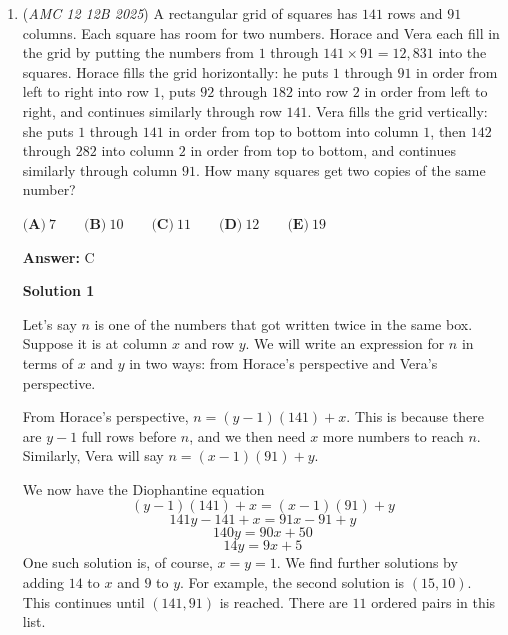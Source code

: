 \begin{enumerate}
 expectation. In addition to the win, the expected number of games is $p(1 + \frac{1}{q})$.

 Assume a loss. That is a $q$ chance. After the first game, he can win with expectation $1p$, lose-win $2qp$, so on which gives $\frac{1}{p}$. The expected result here is $q(1+\frac{1}{p})$.

 The requested result is 

 
 \[\left(\frac{1}{3}\right) \left(1+\frac{3}{2}\right) + \left(\frac{2}{3}\right)(1+3) = \frac{5}{6} + \frac{8}{3} = \boxed{\frac{7}{2}}.\]



	\item (\textit{AMC 12 12B 2025}) A rectangular grid of squares has $141$ rows and $91$ columns. Each square has room for two numbers. Horace and Vera each fill in the grid by putting the numbers from $1$ through $141 \times 91 = 12{,}831$ into the squares. Horace fills the grid horizontally: he puts $1$ through $91$ in order from left to right into row $1$, puts $92$ through $182$ into row $2$ in order from left to right, and continues similarly through row $141$. Vera fills the grid vertically: she puts $1$ through $141$ in order from top to bottom into column $1$, then $142$ through $282$ into column $2$ in order from top to bottom, and continues similarly through column $91$. How many squares get two copies of the same number?


 $\textbf{(A)}~7 \qquad \textbf{(B)}~10 \qquad \textbf{(C)}~11 \qquad \textbf{(D)}~12 \qquad \textbf{(E)}~19$

 \textbf{Answer: }C



\textbf{Solution 1}

Let's say $n$ is one of the numbers that got written twice in the same box. Suppose it is at column $x$ and row $y$. We will write an expression for $n$ in terms of $x$ and $y$ in two ways: from Horace's perspective and Vera's perspective.

 From Horace's perspective, $n = (y-1)(141) + x$. This is because there are $y-1$ full rows before $n$, and we then need $x$ more numbers to reach $n$. Similarly, Vera will say $n = (x-1)(91) + y$.

 We now have the Diophantine equation
 \[(y-1)(141) + x = (x-1)(91)+y\]
 \[141y-141+x = 91x-91+y\]
 \[140y=90x+50\]
 \[14y = 9x + 5\]One such solution is, of course, $x=y=1$. We find further solutions by adding $14$ to $x$ and $9$ to $y$. For example, the second solution is $(15,10)$. This continues until $(141,91)$ is reached. There are $\boxed{11}$ ordered pairs in this list.


\end{enumerate}
